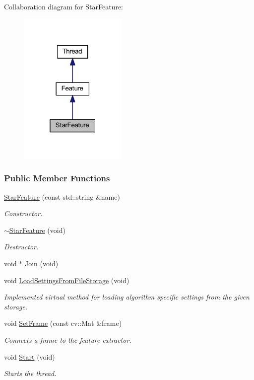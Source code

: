 Collaboration diagram for Star\-Feature\-:
\nopagebreak
\begin{figure}[H]
\begin{center}
\leavevmode
\includegraphics[width=148pt]{class_star_feature__coll__graph}
\end{center}
\end{figure}
\subsubsection*{Public Member Functions}
\begin{DoxyCompactItemize}
\item 
\hyperlink{group___feature_extractor_a52548ee009bbc2160f504d5976fe8620}{Star\-Feature} (const std\-::string \&name)
\begin{DoxyCompactList}\small\item\em Constructor. \end{DoxyCompactList}\item 
\hyperlink{group___feature_extractor_a1f06b1c6af33b303a608828db923cb8c}{$\sim$\-Star\-Feature} (void)
\begin{DoxyCompactList}\small\item\em Destructor. \end{DoxyCompactList}\item 
void $\ast$ \hyperlink{group___core_a8f33f7750321d5df9188033e7e3e300d}{Join} (void)
\item 
void \hyperlink{group___feature_extractor_a0a46cb80a6a4d45e324757b4ef679e81}{Load\-Settings\-From\-File\-Storage} (void)
\begin{DoxyCompactList}\small\item\em Implemented virtual method for loading algorithm specific settings from the given storage. \end{DoxyCompactList}\item 
void \hyperlink{group___feature_extractor_af261b9c5cac5ff1fb628317c7009c845}{Set\-Frame} (const cv\-::\-Mat \&frame)
\begin{DoxyCompactList}\small\item\em Connects a frame to the feature extractor. \end{DoxyCompactList}\item 
void \hyperlink{group___core_a2b42f82341afd2747ea093b6ac8b91cb}{Start} (void)
\begin{DoxyCompactList}\small\item\em Starts the thread. \end{DoxyCompactList}\end{DoxyCompactItemize}
